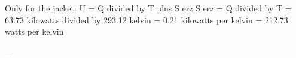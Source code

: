 Only for the jacket:  
U = Q divided by T plus S erz  
S erz = Q divided by T  
= 63.73 kilowatts divided by 293.12 kelvin  
= 0.21 kilowatts per kelvin  
= 212.73 watts per kelvin  

---